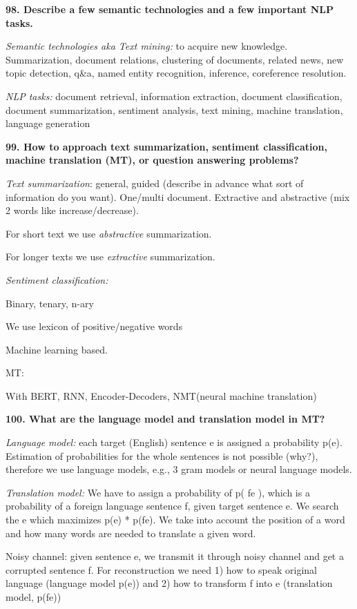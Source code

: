 \textbf{98. Describe a few semantic technologies and a few important NLP
tasks.}

\textit{Semantic technologies aka Text mining:} to acquire new
knowledge. Summarization, document relations, clustering of documents,
related news, new topic detection, q\&a, named entity recognition,
inference, coreference resolution.

\textit{NLP tasks:} document retrieval, information extraction, document 
classification, document summarization, sentiment analysis, text mining, 
machine translation, language generation

\textbf{99. How to approach text summarization, sentiment
classification, machine translation (MT), or question answering
problems?}

\textit{Text summarization}: general, guided (describe in advance
what sort of information do you want). One/multi document. Extractive
and abstractive (mix 2 words like increase/decrease).

For short text we use \textit{abstractive} summarization.

For longer texts we use \textit{extractive} summarization.

\textit{Sentiment classification:}

Binary, tenary, n-ary

We use lexicon of positive/negative words

Machine learning based.

MT:

With BERT, RNN, Encoder-Decoders, NMT(neural machine translation)

\textbf{100. What are the language model and translation model in MT?}

\textit{Language model:} each target (English) sentence e is assigned
a probability p(e). Estimation of probabilities for the whole sentences
is not possible (why?), therefore we use language models, e.g., 3 gram
models or neural language models.

\textit{Translation model:} We have to assign a probability of p(
f\textbar e ), which is a probability of a foreign language sentence f,
given target sentence e. We search the e which maximizes p(e) *
p(f\textbar e). We take into account the position of a word and how many
words are needed to translate a given word.

Noisy channel: given sentence e, we transmit it through noisy channel
and get a corrupted sentence f. For reconstruction we need 1) how to
speak original language (language model p(e)) and 2) how to transform f
into e (translation model, p(f\textbar e))

